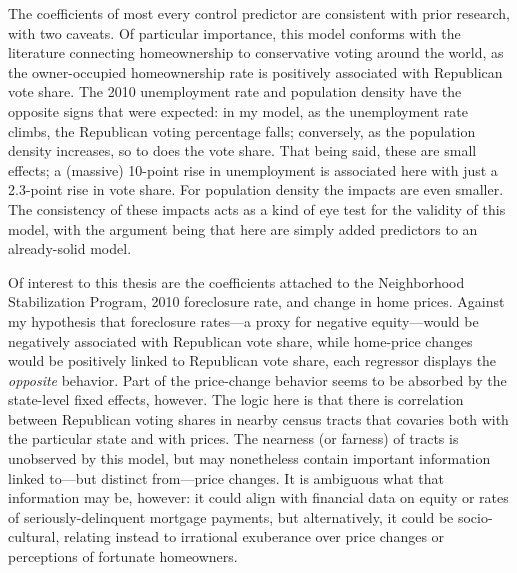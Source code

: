 \documentclass[
]{article}
\begin{document}
The coefficients of most every control predictor are consistent with prior research, with two caveats.
Of particular importance, this model conforms with the literature connecting homeownership to conservative voting around the world, as the owner-occupied homeownership rate is positively associated with Republican vote share.
The 2010 unemployment rate and population density have the opposite signs that were expected: in my model, as the unemployment rate climbs, the Republican voting percentage falls; conversely, as the population density increases, so to does the vote share.
That being said, these are small effects; a (massive) 10-point rise in unemployment is associated here with just a 2.3-point rise in vote share.
For population density the impacts are even smaller.
The consistency of these impacts acts as a kind of eye test for the validity of this model, with the argument being that here are simply added predictors to an already-solid model.

Of interest to this thesis are the coefficients attached to the Neighborhood Stabilization Program, 2010 foreclosure rate, and change in home prices.
Against my hypothesis that foreclosure rates---a proxy for negative equity---would be negatively associated with Republican vote share, while home-price changes would be positively linked to Republican vote share, each regressor displays the \emph{opposite} behavior.
Part of the price-change behavior seems to be absorbed by the state-level fixed effects, however.
The logic here is that there is correlation between Republican voting shares in nearby census tracts that covaries both with the particular state and with prices.
The nearness (or farness) of tracts is unobserved by this model, but may nonetheless contain important information linked to---but distinct from---price changes.
It is ambiguous what that information may be, however: it could align with financial data on equity or rates of seriously-delinquent mortgage payments, but alternatively, it could be socio-cultural, relating instead to irrational exuberance over price changes or perceptions of fortunate homeowners.
\end{document}
